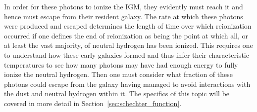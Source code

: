 	In order for these photons to ionize the IGM, they evidently must reach it and hence must escape from their resident galaxy. The rate at which these photons were produced and escaped determines the length of time over which reionization occurred if one defines the end of reionization as being the point at which all, or at least the vast majority, of neutral hydrogen has been ionized. This requires one to understand how these early galaxies formed and thus infer their characteristic temperatures to see how many photons may have had enough energy to fully ionize the neutral hydrogen. Then one must consider what fraction of these photons could escape from the galaxy having managed to avoid interactions with the dust and neutral hydrogen within it. The specifics of this topic will be covered in more detail in Section~\ref{sec:schechter_function}.
